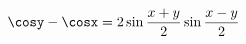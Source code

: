 \documentclass[preview]{standalone}
\begin{document}
\begin{align*}
\cosy - \cosx = 2 \sin\frac{x+y}{2}\sin\frac{x-y}{2}
\end{align*}
\end{document}
